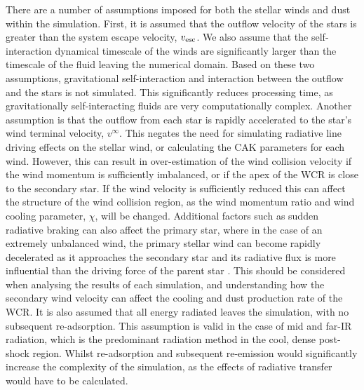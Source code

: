 There are a number of assumptions imposed for both the stellar winds and dust within the simulation.
First, it is assumed that the outflow velocity of the stars is greater than the system escape velocity, $v_\text{esc}$.
We also assume that the self-interaction dynamical timescale of the winds are significantly larger than the timescale of the fluid leaving the numerical domain.
Based on these two assumptions, gravitational self-interaction and interaction between the outflow and the stars is not simulated.
This significantly reduces processing time, as gravitationally self-interacting fluids are very computationally complex.
Another assumption is that the outflow from each star is rapidly accelerated to the star's wind terminal velocity, $v^\infty$.
This negates the need for simulating radiative line driving effects on the stellar wind, or calculating the CAK parameters for each wind.
However, this can result in over-estimation of the wind collision velocity if the wind momentum is sufficiently imbalanced, or if the apex of the WCR is close to the secondary star.
If the wind velocity is sufficiently reduced this can affect the structure of the wind collision region, as the wind momentum ratio and wind cooling parameter, $\chi$, will be changed.
Additional factors such as sudden radiative braking can also affect the primary star, where in the case of an extremely unbalanced wind, the primary stellar wind can become rapidly decelerated as it approaches the secondary star and its radiative flux is more influential than the driving force of the parent star \parencite{gayley_sudden_1997}.
This should be considered when analysing the results of each simulation, and understanding how the secondary wind velocity can affect the cooling and dust production rate of the WCR.
It is also assumed that all energy radiated leaves the simulation, with no subsequent re-adsorption.
This assumption is valid in the case of mid and far-IR radiation, which is the predominant radiation method in the cool, dense post-shock region.
Whilst re-adsorption and subsequent re-emission would significantly increase the complexity of the simulation, as the effects of radiative transfer would have to be calculated.

